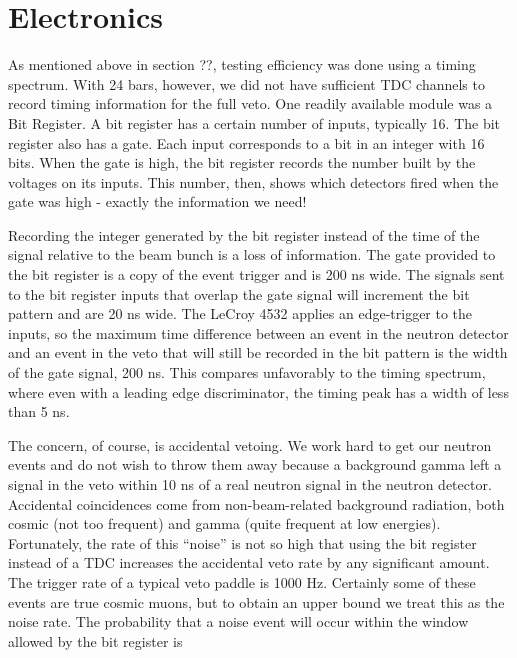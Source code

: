 \section{Electronics}

As mentioned above in section ??, testing efficiency was done using a timing spectrum.  With 24 bars, however, we did not have sufficient TDC channels to record timing information for the full veto.  One readily available module was a Bit Register.  A bit register has a certain number of inputs, typically 16.  The bit register also has a gate.  Each input corresponds to a bit in an integer with 16 bits.  When the gate is high, the bit register records the number built by the voltages on its inputs.  This number, then, shows which detectors fired when the gate was high - exactly the information we need!

Recording the integer generated by the bit register instead of the time of the signal relative to the beam bunch is a loss of information.  The gate provided to the bit register is a copy of the event trigger and is 200 ns wide.  The signals sent to the bit register inputs that overlap the gate signal will increment the bit pattern and are 20 ns wide.  The LeCroy 4532 applies an edge-trigger to the inputs, so the maximum time difference between an event in the neutron detector and an event in the veto that will still be recorded in the bit pattern is the width of the gate signal, 200 ns.  This compares unfavorably to the timing spectrum, where even with a leading edge discriminator, the timing peak has a width of less than 5 ns.

The concern, of course, is accidental vetoing.  We work hard to get our neutron events and do not wish to throw them away because a background gamma left a signal in the veto within 10 ns of a real neutron signal in the neutron detector.  Accidental coincidences come from non-beam-related background radiation, both cosmic (not too frequent) and gamma (quite frequent at low energies).  Fortunately, the rate of this ``noise'' is not so high that using the bit register instead of a TDC increases the accidental veto rate by any significant amount.  The trigger rate of a typical veto paddle is 1000 Hz.  Certainly some of these events are true cosmic muons, but to obtain an upper bound we treat this as the noise rate.  The probability that a noise event will occur within the window allowed by the bit register is 

